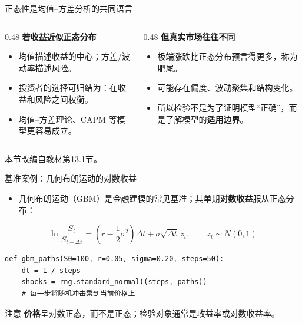 \documentclass[9pt]{ctexbeamer}
\begin{document}
\begin{frame}{正态性是均值--方差分析的共同语言}
  \begin{columns}[T,totalwidth=\textwidth]
    \begin{column}{0.48\textwidth}
      \textbf{若收益近似正态分布}
      \begin{itemize}
        \item 均值描述收益的中心；方差/波动率描述风险。
        \item 投资者的选择可归结为：\alert{在收益和风险之间权衡}。
        \item 均值--方差理论、CAPM 等模型更容易成立。
      \end{itemize}
    \end{column}
    \begin{column}{0.48\textwidth}
      \textbf{但真实市场往往不同}
      \begin{itemize}
        \item 极端涨跌比正态分布预言得更多，称为\alert{肥尾}。
        \item 可能存在偏度、波动聚集和结构变化。
        \item 所以检验不是为了证明模型“正确”，而是了解模型的\textbf{适用边界}。
      \end{itemize}
    \end{column}
  \end{columns}
  \vspace{0.5em}
  \begin{center}
    本节改编自教材第13.1节\citep{hilpisch2018python}。
  \end{center}
\end{frame}

\begin{frame}[fragile]{基准案例：几何布朗运动的对数收益}
  \begin{itemize}
    \item 几何布朗运动（GBM）是金融建模的常见基准；其单期\textbf{对数收益}服从正态分布：
  \end{itemize}
  \begin{equation*}
    \ln\frac{S_t}{S_{t-\Delta t}}
    = \left(r-\frac{1}{2}\sigma^2\right)\Delta t
      +\sigma\sqrt{\Delta t}\,z_t,\qquad z_t\sim N(0,1)
  \end{equation*}
\begin{lstlisting}
def gbm_paths(S0=100, r=0.05, sigma=0.20, steps=50):
    dt = 1 / steps
    shocks = rng.standard_normal((steps, paths))
    # 每一步将随机冲击乘到当前价格上
\end{lstlisting}
  \begin{alertblock}{注意}
    \textbf{价格}呈对数正态，而不是正态；检验对象通常是\alert{收益率}或\alert{对数收益率}。
  \end{alertblock}
\end{frame}
\end{document}
